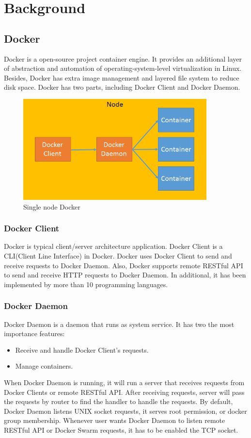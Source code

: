 \chapter{Background}
\label{chap:background}
\section{Docker}
Docker \cite{Docker} is a open-source project container engine. It provides an additional layer of abstraction and automation of operating-system-level virtualization in Linux. Besides, Docker has extra image management and layered file system to reduce disk space. Docker has two parts, including Docker Client and Docker Daemon.

\begin{figure}[h]
\begin{center}
\includegraphics[width=10cm]{figure/single_node.png}
\end{center}
\caption{Single node Docker}
\end{figure}

\subsection{Docker Client}
Docker is typical client/server architecture application.
Docker Client is a \linebreak CLI(Client Line Interface) in Docker.
Docker uses Docker Client to send and receive requests to Docker Daemon. Also, Docker supports remote RESTful API to send and receive HTTP requests to Docker Daemon.
In additional, it has been implemented by more than 10 programming languages.

\subsection{Docker Daemon}
Docker Daemon is a daemon that runs as system service. It has two the most importance features: 
\begin{itemize}
    \item Receive and handle Docker Client's requests.
    \item Manage containers.
\end{itemize}
When Docker Daemon is running, it will run a server that receives requests from Docker Clients or remote RESTful API. After receiving requests, server will pass the requests by router to find the handler to handle the requests. By default, Docker Daemon listens UNIX socket requests, it serves root permission, or docker group membership. Whenever user wants Docker Daemon to listen remote RESTful API or Docker Swarm requests, it has to be enabled the TCP socket.


